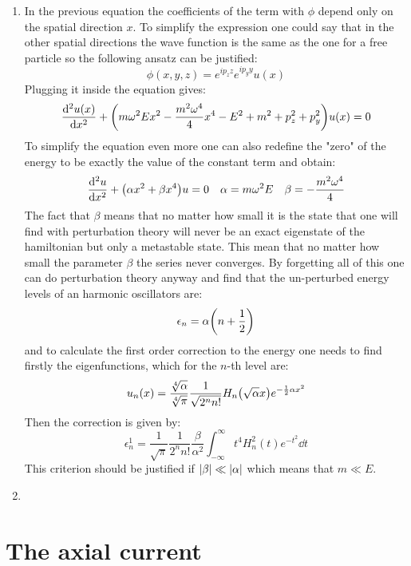 \documentclass[11pt, oneside]{article}   	%
\begin{document}
\begin{enumerate}[label=\alph*)]
\item In the previous equation the coefficients of the term with $\phi$ depend only on the spatial direction $x$. To simplify the expression one could say that in the other spatial directions the wave function is the same as the one for a free particle so the following ansatz can be justified:
\[
	\phi (x, y, z) = e^{i p_z z} e^{i p_y y} u(x)
\]
Plugging it inside the equation gives:
\[
	\dv[2]{u(x)}{x} + \qty( m\omega^2 E x^2 - \frac{m^2\omega^4}{4} x^4 - E^2 + m^2 + p_z^2 + p_y^2) u(x) = 0
\]
To simplify the equation even more one can also redefine the "zero" of the energy to be exactly the value of the constant term and obtain:
\[
	\dv[2]{u}{x} + \qty(\alpha x^2 + \beta x^4)u = 0  \quad \alpha = m\omega^2 E \quad \beta = - \frac{m^2\omega^4}{4}
\]
The fact that $\beta$ means that no matter how small it is the state that one will find with perturbation theory will never be an exact eigenstate of the hamiltonian but only a metastable state. This mean that no matter how small the parameter $\beta$ the series never converges. By forgetting all of this one can do perturbation theory anyway and find that the un-perturbed energy levels of an harmonic oscillators are:
\[
	\epsilon_n = \alpha \qty(n + \frac{1}{2})
\]
and to calculate the first order correction to the energy one needs to find firstly the eigenfunctions, which for the $n$-th level are:
\[
	u_n(x) = \frac{\sqrt[4]{\alpha}}{\sqrt[4]{\pi}}\frac{1}{\sqrt{2^n n !}} H_n\qty(\sqrt{\alpha} x) e^{-\frac{1}{2}\alpha x^2}
\]
Then the correction is given by:
\[
	\epsilon^1_n = \frac{1}{\sqrt{\pi}} \frac{1}{2^n n!} \frac{\beta}{\alpha^2} \int_{-\infty}^\infty t^4 H_n^2(t) e^{-t^2} \dd{t}
 \]
This criterion should be justified if $\abs{\beta} \ll \abs{\alpha}$ which means that $m \ll E$.

\item 

\end{enumerate}

\section{The axial current}
\end{document}
